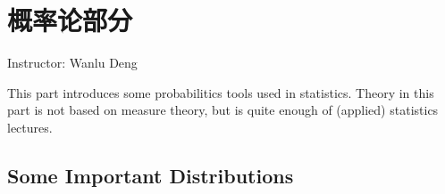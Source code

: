 \chapter{概率论部分}\label{Section1Probability}
\begin{center}
    Instructor: Wanlu Deng
\end{center}


    




This part introduces some probabilitics tools used in statistics. Theory in this part is not based on measure theory, but is quite enough of (applied) statistics lectures.







\section{Some Important Distributions}\label{SectionImportantDistributions}

